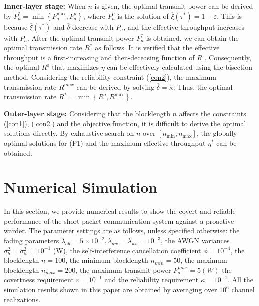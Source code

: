 \documentclass[conference]{IEEEtran}
\begin{document}
{\textbf{Inner-layer stage:}} When $n$ is given, the optimal transmit power can be derived by $P_a^* = \min \left\{ {P_a^{\max },P_a^o} \right\}$, where ${P_a^o}$ is the solution of $\overline \xi  \left( {{\tau ^*}} \right) = 1 - \varepsilon $. This is because  $\overline \xi  \left( {{\tau ^*}} \right)$ and $\overline \delta$ decrease with $P_a$, and the effective throughput increases with $P_a$. After the optimal transmit power $P_a^*$ is obtained, we can obtain the optimal transmission rate $R^*$ as follows. It is verified that the effective throughput is a first-increasing and then-deceasing function of $R$ \cite{jammer}. Consequently, the optimal $R^o$ that maximizes $\eta$ can be effectively calculated using the bisection method. Considering the reliability constraint (\ref{con2}), the maximum transmission rate $R^{max}$ can be derived by solving $\overline \delta = \kappa $. Thus, the optimal transmission rate ${R^*} = \min \left\{ {{R^o},{R^{\max }}} \right\}$.

{\textbf{Outer-layer stage:}} Considering that the blocklength $n$ affects the constraints (\ref{con1}), (\ref{con2}) and the objective function, it is difficult to derive the optimal solutions directly. By exhaustive search on $n$ over $\left[ {{n_{\min }},{n_{\max }}} \right]$, the globally optimal solutions for (P1) and the maximum effective throughput $\eta^*$ can be obtained.

\section{Numerical Simulation}

In this section, we provide numerical results to show the covert and reliable performance of the short-packet communication system against a proactive warder. The parameter settings are as follows, unless specified otherwise: the fading parameters $\lambda_{ab}=5\times10^{-2},\lambda_{aw}=\lambda_{wb}=10^{-3}$, the AWGN variances $\sigma_b^2=\sigma_w^2=10^{-1}$ (W), the self-interference cancellation coefficient $\phi=10^{-4}$, the blocklength $n=100$, the minimum blocklength $n_{min}=50$, the maximum blocklength $n_{max}=200$, the maximum transmit power $P_a^{max}=5 (W)$ the covertness requirement $\varepsilon=10^{-1}$ and the reliability requirement $\kappa=10^{-1}$. All the simulation results shown in this paper are obtained by averaging over $10^{6}$ channel realizations.
\end{document}
